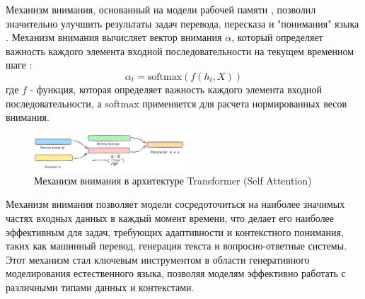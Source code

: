 Механизм внимания, основанный на модели рабочей памяти \cite{wallace1960plans}, позволил значительно улучшить результаты
задач перевода, пересказа и "понимания" языка \cite{bahdanau2014neural}.
Механизм внимания вычисляет вектор внимания \( \alpha \), который определяет важность каждого элемента входной 
последовательности на текущем временном шаге \cite{bahdanau2014neural}:
\begin{equation}
    \alpha_t = \text{softmax}(f(h_t, X))
\end{equation}
где \( f \) - функция, которая определяет важность каждого элемента входной последовательности, 
а \( \text{softmax} \) применяется для расчета нормированных весов внимания.

\begin{figure}[h]
    \centering
    \includegraphics[width=0.5\textwidth]{assets/ml/nn/attention.excalidraw.png}
    \caption{Механизм внимания в архитектуре Transformer (Self Attention) \cite{vaswani2017attention} }
    \label{self_attention}
\end{figure}

Механизм внимания позволяет модели сосредоточиться на наиболее значимых частях входных данных в каждый момент времени, 
что делает его наиболее эффективным для задач, требующих адаптивности и контекстного понимания, таких как машинный перевод, 
генерация текста и вопросно-ответные системы. Этот механизм стал ключевым инструментом в области генеративного 
моделирования естественного языка, позволяя моделям эффективно работать с различными типами данных и контекстами.

